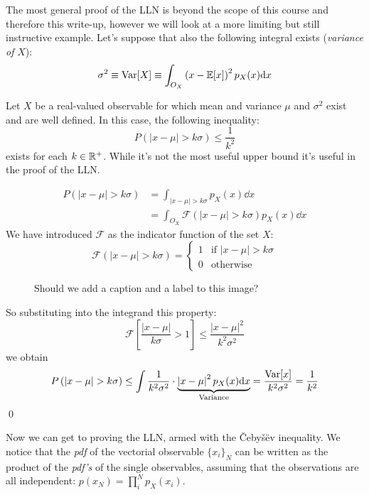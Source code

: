 \begin{example}
	The most general proof of the LLN is beyond the scope of this course and therefore this write-up, however we will look at a more limiting but still instructive example. Let's suppose that also the following integral exists (\emph{variance of} $X$):
	\[
	\sigma^2 \equiv \operatorname{Var}[X] \equiv \int_{O_X}\left( x-\mathbb{E}[x]\right)^2p_X(x)\mathrm{d} x
	\] 
\begin{lemma}
	Let $X$ be a real-valued observable for which mean and variance $\mu$ and $\sigma^2$ exist and are well defined. In this case, the following inequality:
	\begin{equation}
	P\left( \left| x-\mu \right|>k\sigma \right)\leq \frac{1}{k^2}
	\label{eq:chebyshev}
	\end{equation}
	exists for each $k\in\mathbb{R}^+$. While it's not the most useful upper bound it's useful in the proof of the LLN. 
\end{lemma}

\begin{example}
		\begin{align*}
			P\left( \left| x-\mu \right|>k\sigma \right) &= \int_{\left| x-\mu \right|>k\sigma} p_X(x)\dd x \\
		&= \int_{O_X} \mathscr{F}\left( \left| x-\mu \right|>k\sigma \right)p_X(x)\dd x
	\end{align*}
	We have introduced $\mathscr{F}$ as the indicator function of the set $X$:
	\[
	\mathscr{F}\left( \left| x-\mu \right|>k\sigma \right) = \begin{cases} 1 & \text{if } \left| x-\mu \right|>k\sigma  \\ 0 &  \text{otherwise} \end{cases}
	\]
	\begin{figure}[H]
		\centering
		
		\caption{Should we add a caption and a label to this image?}
	\end{figure}
	So substituting into the integrand this property:
	\[
	\mathscr{F}\left[ \frac{\left| x-\mu \right|}{k\sigma} > 1 \right] \leq \frac{\left| x-\mu \right|^2}{k^2\sigma^2} 
	\]
	we obtain 
	\[
	P\left( \left| x-\mu \right|>k\sigma \right) \leq \int \frac{1}{k^2\sigma^2}\cdot \underbrace{\left| x-\mu \right|^2 p_X(x)\dd x}_{\text{Variance}} = \frac{\Var[x]}{k^2\sigma^2} = \frac{1}{k^2}
	\]
	\qed
\end{example}

Now we can get to proving the LLN, armed with the Čebyšëv inequality. We notice that the \emph{pdf} of the vectorial observable $\{x_i\}_N$ can be written as the product of the \emph{pdf's} of the single observables, assuming that the observations are all independent: $p(x_N)=\prod_i^N p_X(x_i)$. 


\end{example}
